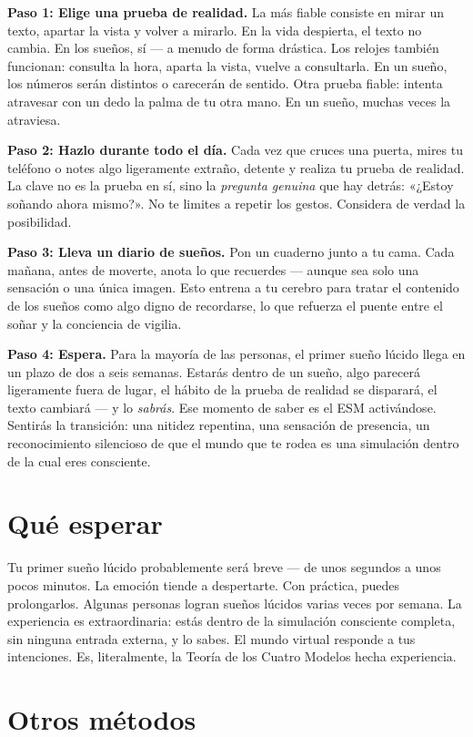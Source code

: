 \documentclass[11pt, twoside, openright]{book}
\begin{document}
\textbf{Paso 1: Elige una prueba de realidad.} La más fiable consiste en mirar un texto, apartar la vista y volver a mirarlo. En la vida despierta, el texto no cambia. En los sueños, sí --- a menudo de forma drástica. Los relojes también funcionan: consulta la hora, aparta la vista, vuelve a consultarla. En un sueño, los números serán distintos o carecerán de sentido. Otra prueba fiable: intenta atravesar con un dedo la palma de tu otra mano. En un sueño, muchas veces la atraviesa.

\textbf{Paso 2: Hazlo durante todo el día.} Cada vez que cruces una puerta, mires tu teléfono o notes algo ligeramente extraño, detente y realiza tu prueba de realidad. La clave no es la prueba en sí, sino la \textit{pregunta genuina} que hay detrás: «¿Estoy soñando ahora mismo?». No te limites a repetir los gestos. Considera de verdad la posibilidad.

\textbf{Paso 3: Lleva un diario de sueños.} Pon un cuaderno junto a tu cama. Cada mañana, antes de moverte, anota lo que recuerdes --- aunque sea solo una sensación o una única imagen. Esto entrena a tu cerebro para tratar el contenido de los sueños como algo digno de recordarse, lo que refuerza el puente entre el soñar y la conciencia de vigilia.

\textbf{Paso 4: Espera.} Para la mayoría de las personas, el primer sueño lúcido llega en un plazo de dos a seis semanas. Estarás dentro de un sueño, algo parecerá ligeramente fuera de lugar, el hábito de la prueba de realidad se disparará, el texto cambiará --- y lo \textit{sabrás}. Ese momento de saber es el ESM activándose. Sentirás la transición: una nitidez repentina, una sensación de presencia, un reconocimiento silencioso de que el mundo que te rodea es una simulación dentro de la cual eres consciente.

\section*{Qué esperar}

Tu primer sueño lúcido probablemente será breve --- de unos segundos a unos pocos minutos. La emoción tiende a despertarte. Con práctica, puedes prolongarlos. Algunas personas logran sueños lúcidos varias veces por semana. La experiencia es extraordinaria: estás dentro de la simulación consciente completa, sin ninguna entrada externa, y lo sabes. El mundo virtual responde a tus intenciones. Es, literalmente, la Teoría de los Cuatro Modelos hecha experiencia.

\section*{Otros métodos}
\end{document}
